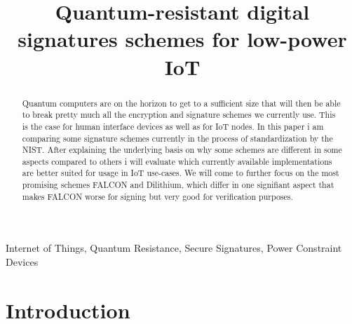 \documentclass[conference]{IEEEtran}
\newcommand{\comment}[1]{}
\begin{document}
\title{Quantum-resistant digital signatures schemes for low-power IoT}

\author{
}

\maketitle

\begin{abstract}
Quantum computers are on the horizon to get to a sufficient size that will then be able to break pretty much all the encryption and signature schemes we currently use. This is the case for human interface devices as well as for IoT nodes. 
In this paper i am comparing some signature schemes currently in the process of standardization by the NIST.
After explaining the underlying basis on why some schemes are different in some aspects compared to others i will evaluate which currently available implementations are better suited for usage in IoT use-cases.
We will come to further focus on the most promising schemes FALCON and Dilithium, which differ in one signifiant aspect that makes FALCON worse for signing but very good for verification purposes.
\end{abstract}

\begin{IEEEkeywords}
Internet of Things, Quantum Resistance, Secure Signatures, Power Constraint Devices
\end{IEEEkeywords}


\section{Introduction}
\comment{ %
} %
\end{document}
